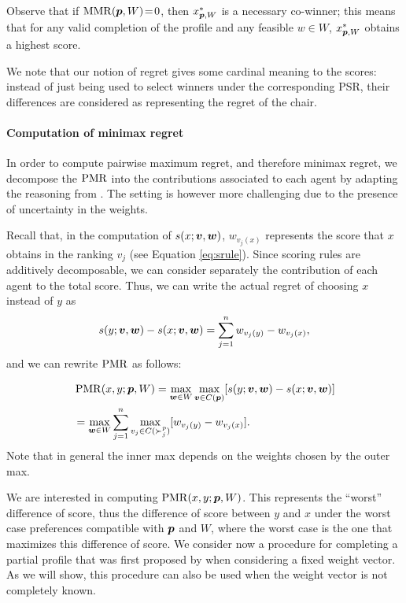 \documentclass[sigconf, anonymous]{aamas}
\begin{document}
Observe that if $\operatorname{MMR}({\bm{p}}, W)\!=\!0$, then $x^{*}_{{\bm{p}},W}$ is a necessary co-winner; this means that for any valid completion of the profile and any feasible $w \!\in\! W$, $x^{*}_{{\bm{p}},W}$ obtains a highest score.

We note that our notion of regret gives some cardinal meaning to the scores: instead of just being used to select winners under the corresponding PSR, their differences are considered as representing the regret of the chair.


\paragraph{Computation of minimax regret}
In order to compute pairwise maximum regret, and therefore minimax regret, we decompose the $\operatorname{PMR}$ into the contributions associated to each agent by adapting the reasoning from \citet{Lu2011}.
The setting is however more challenging due to the presence of uncertainty in the weights.

Recall that, in the computation of $s(x; \bm{v}, \bm{w})$, $w_{v_j(x)}$ represents the score that $x$ obtains in the ranking $v_j$ (see Equation \ref{eq:srule}).
Since scoring rules are additively decomposable, we can consider separately the contribution of each agent to the total score. Thus, we can write the actual regret of choosing $x$ instead of $y$ as
\[
s(y; \bm{v},\bm{w}) - s(x; \bm{v}, \bm{w}) = \sum_{j=1}^n w_{v_j(y)} - w_{v_j(x)},
\]
and we can rewrite $\operatorname{PMR}$ as follows:

\begin{align}
	& \operatorname{PMR}(x,y; {\bm{p}}, W) = \max_{\bm{w} \in W} \max_{\bm{v} \in C({\bm{p}})} [ s(y; \bm{v},\bm{w}) - s(x; \bm{v},\bm{w}) ] \\
	& =  \max_{\bm{w} \in W} \sum_{j=1}^{n} \max_{v_j \in C(\succ_j^p)} [w_{v_j(y)} - w_{v_j(x)}]. \\
\end{align}
Note that in general the inner max depends on the weights chosen by the outer max.

We are interested in computing $\operatorname{PMR}(x, y; {\bm{p}}, W)$. This represents the “worst” difference of score, thus the difference of score between $y$ and $x$ under the worst case preferences compatible with ${\bm{p}}$ and $W$, where the worst case is the one that maximizes this difference of score.
We consider now a procedure for completing a partial profile that was first proposed by \citet{Lu2011} when considering %
a fixed weight vector.
As we will show, this procedure can also be used when the weight vector is not completely known.
\end{document}
